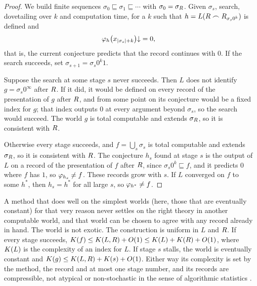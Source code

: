 \begin{proof}
We build finite sequences $\sigma_0\sqsubseteq\sigma_1\sqsubseteq\cdots$ with
$\sigma_0=\sigma_R$. Given $\sigma_s$, search, dovetailing over $k$ and computation
time, for a $k$ such that $h=L(R\frown R_{\sigma_s0^k})$ is defined and
\[
  \varphi_{h}\bigl(x_{|\sigma_s|+k}\bigr)\mathord{\downarrow} = 0,
\]
that is, the current conjecture predicts that the record continues with $0$. If the
search succeeds, set $\sigma_{s+1}=\sigma_s0^k1$.

Suppose the search at some stage $s$ never succeeds. Then $L$ does not identify
$g=\sigma_s0^\infty$ after $R$. If it did, it would be defined on every record of
the presentation of $g$ after $R$, and from some point on its conjecture would be a
fixed index for $g$; that index outputs $0$ at every argument beyond $\sigma_s$, so the
search would succeed. The world $g$ is total computable and extends $\sigma_R$, so it
is consistent with $R$.

Otherwise every stage succeeds, and $f=\bigcup_s\sigma_s$ is total computable and
extends $\sigma_R$, so it is consistent with $R$. The conjecture $h_s$ found at
stage $s$ is the output of $L$ on a record of the presentation of $f$ after $R$,
since $\sigma_s0^k\sqsubseteq f$, and it predicts $0$ where $f$ has $1$, so
$\varphi_{h_s}\ne f$. These records grow with $s$. If $L$ converged on $f$ to some $h^*$, then
$h_s=h^*$ for all large $s$, so $\varphi_{h^*}\ne f$.
\end{proof}

A method that does well on the simplest worlds (here, those that are eventually
constant) for that very reason never settles on the right theory in another computable
world, and that world can be chosen to agree with any record already in hand. The world
is not exotic. The construction is uniform in $L$ and $R$. If every stage succeeds,
$K(f)\le K(L,R)+O(1)\le K(L)+K(R)+O(1)$, where $K(L)$ is the complexity of an
index for $L$. If stage $s$ stalls, the world is eventually constant and
$K(g)\le K(L,R)+K(s)+O(1)$. Either way its complexity is set by the method, the
record and at most one stage number, and its records are compressible, not atypical or
non-stochastic in the sense of algorithmic statistics \citep{gacs2001}.

